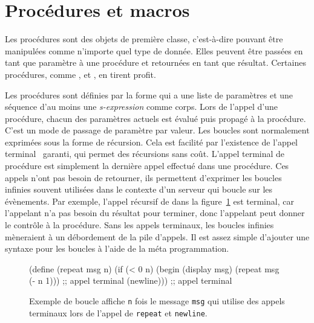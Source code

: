 \section{Procédures et macros}
\label{sec:proc_and_macro}

Les procédures sont des objets de première classe, c'est-à-dire pouvant
être manipulées comme n'importe quel type de donnée. Elles peuvent
être passées en tant que paramètre à une procédure et retournées en tant que
résultat.  Certaines procédures, comme ,  et
, en tirent profit.

Les procédures sont définies par la forme  qui a une liste de
paramètres et une séquence d'au moins une \textit{s-expression} comme corps.
Lors de l'appel d'une procédure, chacun des paramètres actuels est évalué puis
propagé à la procédure. C'est un mode de passage de paramètre par valeur. Les
boucles sont normalement exprimées sous la forme de récursion.  Cela est
facilité par l'existence de l'appel terminal~\cite{DBLP:conf/acm/Steele77}
garanti, qui permet des récursions sans coût. L'appel terminal de procédure est
simplement la dernière appel effectué dans une procédure. Ces appels n'ont pas
besoin de retourner, ils permettent d'exprimer les boucles infinies souvent
utilisées dans le contexte d'un serveur qui boucle sur les évènements.  Par
exemple, l'appel récursif de  dans la
figure~\ref{fig:appel_terminal_example} est terminal, car l'appelant n'a pas
besoin du résultat pour terminer, donc l'appelant peut donner le contrôle à la
procédure. Sans les appels terminaux, les boucles infinies mèneraient à un
débordement de la pile d'appels. Il est assez simple d'ajouter une syntaxe pour
les boucles à l'aide de la méta programmation.

\begin{figure}[ht]
  \begin{mplisting}{0.9}
(define (repeat msg n)
  (if (< 0 n)
      (begin
        (display msg)
        (repeat msg (- n 1))) ;; appel terminal
      (newline))) ;; appel terminal
\end{mplisting}
  \caption{Exemple de boucle affiche {\tt n} fois le message {\tt msg} qui
    utilise des appels terminaux lors de l'appel de {\tt repeat} et
    {\tt newline}.}
  \label{fig:appel_terminal_example}
\end{figure}


